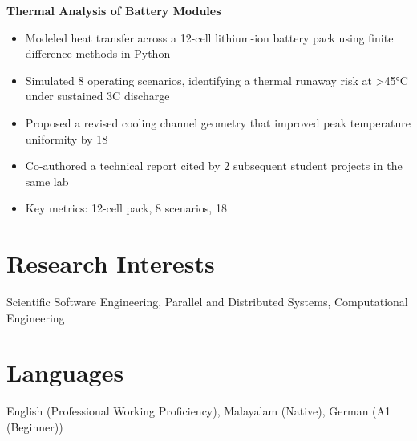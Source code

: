 \documentclass[11pt,a4paper]{article}
\begin{document}
\textbf{ Thermal Analysis of Battery Modules }
\begin{itemize}[leftmargin=*,nosep,topsep=2pt]
    
    \item Modeled heat transfer across a 12-cell lithium-ion battery pack using finite difference methods in Python
    
    \item Simulated 8 operating scenarios, identifying a thermal runaway risk at >45°C under sustained 3C discharge
    
    \item Proposed a revised cooling channel geometry that improved peak temperature uniformity by 18%
    
    \item Co-authored a technical report cited by 2 subsequent student projects in the same lab
    
    \item Key metrics: 12-cell pack, 8 scenarios, 18%
    
\end{itemize}


\section{Research Interests}
Scientific Software Engineering, Parallel and Distributed Systems, Computational Engineering

\section{Languages}
English (Professional Working Proficiency), Malayalam (Native), German (A1 (Beginner))
\end{document}
